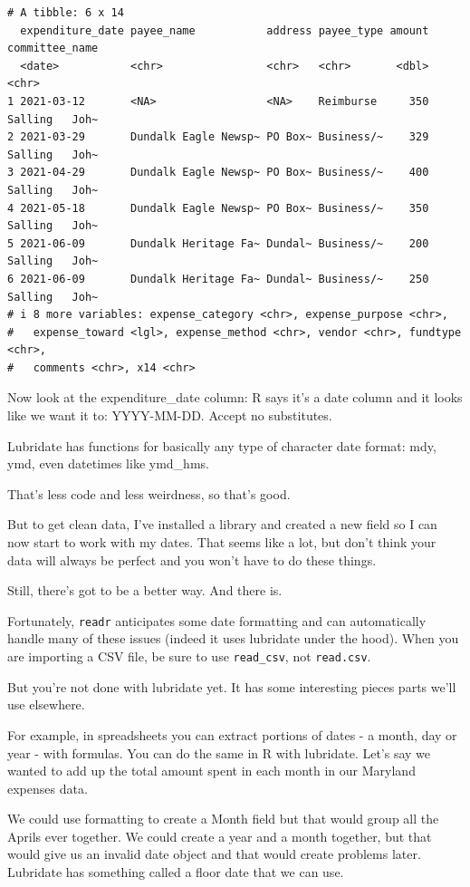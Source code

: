 \documentclass[
  letterpaper,
  DIV=11,
  numbers=noendperiod]{scrreprt}
\begin{document}
\begin{verbatim}
# A tibble: 6 x 14
  expenditure_date payee_name           address payee_type amount committee_name
  <date>           <chr>                <chr>   <chr>       <dbl> <chr>         
1 2021-03-12       <NA>                 <NA>    Reimburse     350 Salling   Joh~
2 2021-03-29       Dundalk Eagle Newsp~ PO Box~ Business/~    329 Salling   Joh~
3 2021-04-29       Dundalk Eagle Newsp~ PO Box~ Business/~    400 Salling   Joh~
4 2021-05-18       Dundalk Eagle Newsp~ PO Box~ Business/~    350 Salling   Joh~
5 2021-06-09       Dundalk Heritage Fa~ Dundal~ Business/~    200 Salling   Joh~
6 2021-06-09       Dundalk Heritage Fa~ Dundal~ Business/~    250 Salling   Joh~
# i 8 more variables: expense_category <chr>, expense_purpose <chr>,
#   expense_toward <lgl>, expense_method <chr>, vendor <chr>, fundtype <chr>,
#   comments <chr>, x14 <chr>
\end{verbatim}

Now look at the expenditure\_date column: R says it's a date column and
it looks like we want it to: YYYY-MM-DD. Accept no substitutes.

Lubridate has functions for basically any type of character date format:
mdy, ymd, even datetimes like ymd\_hms.

That's less code and less weirdness, so that's good.

But to get clean data, I've installed a library and created a new field
so I can now start to work with my dates. That seems like a lot, but
don't think your data will always be perfect and you won't have to do
these things.

Still, there's got to be a better way. And there is.

Fortunately, \texttt{readr} anticipates some date formatting and can
automatically handle many of these issues (indeed it uses lubridate
under the hood). When you are importing a CSV file, be sure to use
\texttt{read\_csv}, not \texttt{read.csv}.

But you're not done with lubridate yet. It has some interesting pieces
parts we'll use elsewhere.

For example, in spreadsheets you can extract portions of dates - a
month, day or year - with formulas. You can do the same in R with
lubridate. Let's say we wanted to add up the total amount spent in each
month in our Maryland expenses data.

We could use formatting to create a Month field but that would group all
the Aprils ever together. We could create a year and a month together,
but that would give us an invalid date object and that would create
problems later. Lubridate has something called a floor date that we can
use.
\end{document}
